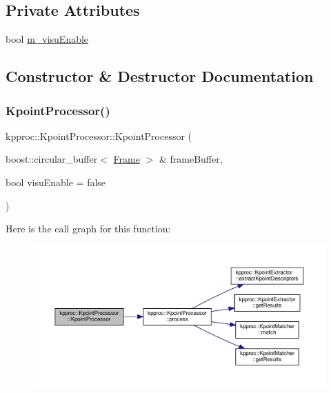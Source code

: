 \subsection*{Private Attributes}
\begin{DoxyCompactItemize}
\item 
bool \hyperlink{classkpproc_1_1KpointProcessor_ac521fd8cfc2400004e729fc504209232}{m\+\_\+visu\+Enable}
\end{DoxyCompactItemize}


\subsection{Constructor \& Destructor Documentation}
\mbox{\label{classkpproc_1_1KpointProcessor_a7a10f7352ccb9ab714052144bde69228}} 
\subsubsection{\texorpdfstring{Kpoint\+Processor()}{KpointProcessor()}}
{\footnotesize\ttfamily kpproc\+::\+Kpoint\+Processor\+::\+Kpoint\+Processor (\begin{DoxyParamCaption}\item[{boost\+::circular\+\_\+buffer$<$ \hyperlink{classFrame}{Frame} $>$ \&}]{frame\+Buffer,  }\item[{bool}]{visu\+Enable = {\ttfamily false} }\end{DoxyParamCaption})\hspace{0.3cm}{\ttfamily [inline]}}

Here is the call graph for this function\+:\nopagebreak
\begin{figure}[H]
\begin{center}
\leavevmode
\includegraphics[width=350pt]{classkpproc_1_1KpointProcessor_a7a10f7352ccb9ab714052144bde69228_cgraph}
\end{center}
\end{figure}


